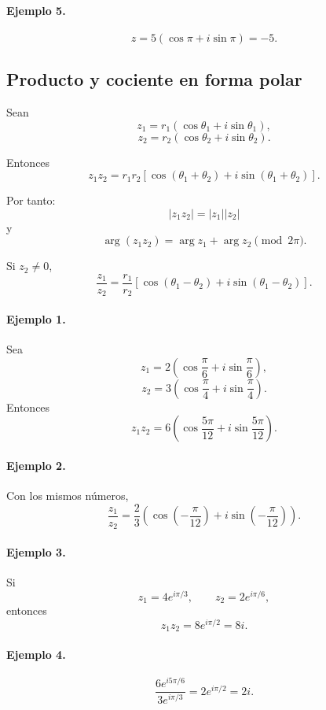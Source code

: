 \paragraph{Ejemplo 5.}
\[
z=5\left(\cos\pi+i\sin\pi\right)
=
-5.
\]

\subsection{Producto y cociente en forma polar}

Sean
\[
z_1=r_1(\cos\theta_1+i\sin\theta_1),
\]
\[
z_2=r_2(\cos\theta_2+i\sin\theta_2).
\]

Entonces
\[
\boxed{
z_1z_2
=
r_1r_2
\left[
\cos(\theta_1+\theta_2)
+i\sin(\theta_1+\theta_2)
\right].
}
\]

Por tanto:
\[
\boxed{
|z_1z_2|=|z_1||z_2|
}
\]
y
\[
\arg(z_1z_2)
=
\arg z_1+\arg z_2
\pmod{2\pi}.
\]

Si $z_2\neq0$,
\[
\boxed{
\frac{z_1}{z_2}
=
\frac{r_1}{r_2}
\left[
\cos(\theta_1-\theta_2)
+i\sin(\theta_1-\theta_2)
\right].
}
\]

\paragraph{Ejemplo 1.}
Sea
\[
z_1=2\left(\cos\frac{\pi}{6}+i\sin\frac{\pi}{6}\right),
\]
\[
z_2=3\left(\cos\frac{\pi}{4}+i\sin\frac{\pi}{4}\right).
\]
Entonces
\[
z_1z_2
=
6
\left(
\cos\frac{5\pi}{12}
+i\sin\frac{5\pi}{12}
\right).
\]

\paragraph{Ejemplo 2.}
Con los mismos números,
\[
\frac{z_1}{z_2}
=
\frac23
\left(
\cos\left(-\frac{\pi}{12}\right)
+i\sin\left(-\frac{\pi}{12}\right)
\right).
\]

\paragraph{Ejemplo 3.}
Si
\[
z_1=4e^{i\pi/3},
\qquad
z_2=2e^{i\pi/6},
\]
entonces
\[
z_1z_2
=
8e^{i\pi/2}
=
8i.
\]

\paragraph{Ejemplo 4.}
\[
\frac{6e^{i5\pi/6}}{3e^{i\pi/3}}
=
2e^{i\pi/2}
=
2i.
\]

